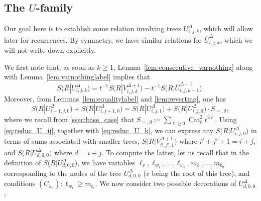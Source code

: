 \documentclass[12pt]{amsart}
\theoremstyle{plain}
\theoremstyle{remark}
\DeclareMathOperator{\Cat}{Cat}
\begin{document}
\subsection{The $U$-family}
Our goal here is to establish some relation involving trees $U^{\Delta}_{i,j,k}$,
which will allow later for recurrences.
By symmetry, we have similar relations for $\overline{U}^{\Delta}_{i,j,k}$,
which we will not write down explicitly.

We first note that, as soon as $k \ge 1$, Lemma~\ref{lem:consecutive_varnothing} along with Lemma~\ref{lem:varnothinglabel} implies 
that
\begin{equation}\label{eq:reduc_U_k}
S\big(R|U^{\Delta}_{i,j,k}\big) = t^{-1} S\big(R|V^{\Delta+1}_{i,j,k}\big) - t^{-1} S\big(R|\overline{U}^{\Delta+1}_{i,j,k-1}\big).
\end{equation}
Moreover, from Lemmas~\ref{lem:equalitylabel} and \ref{lem:reverting}, one has
\begin{equation}\label{eq:reduc_U_ij}
S\big(R|U^{\Delta}_{i+1,j,0}\big) + S\big(R|U^{\Delta}_{i,j+1,0}\big) = S\big(R|U^{\Delta}_{i,j,1}\big) + S\big(R|U^{\Delta}_{i,j,0}\big) \cdot S_{=,0},
\end{equation}
where we recall from \cref{ssec:base_case} that $S_{=,0}\coloneqq \sum_{\ell \ge 0} \Cat_{\ell}^2 t^{2\ell}$.
Using \cref{eq:reduc_U_ij}, together with \cref{eq:reduc_U_k},
we can express any $S\big(R|U^{\Delta}_{i,j,0}\big)$
in terms of sums associated with smaller trees, $S\big(R|V^{\Delta+1}_{i',j',1}\big)$ where $i'+j'+1=i+j$, and $S\big(R|U^{\Delta}_{d,0,0}\big)$ where $d=i+j$.
To compute the latter, let us recall that in the definition of $S\big(R|U^{\Delta}_{d,0,0}\big)$,
we have variables $\ell_v, \ell_{w_1}, \dots, \ell_{w_d}, m_{b_1}, \dots, m_{b_d}$ corresponding to the nodes of the tree $U^{\Delta}_{d,0,0}$ ($v$ being the root of this tree),
and conditions $(C_{w_i}): \ell_{w_i} \ge m_{b_i}$.
We now consider two possible decorations of $U^{\Delta}_{d,0,0}$:
\end{document}
